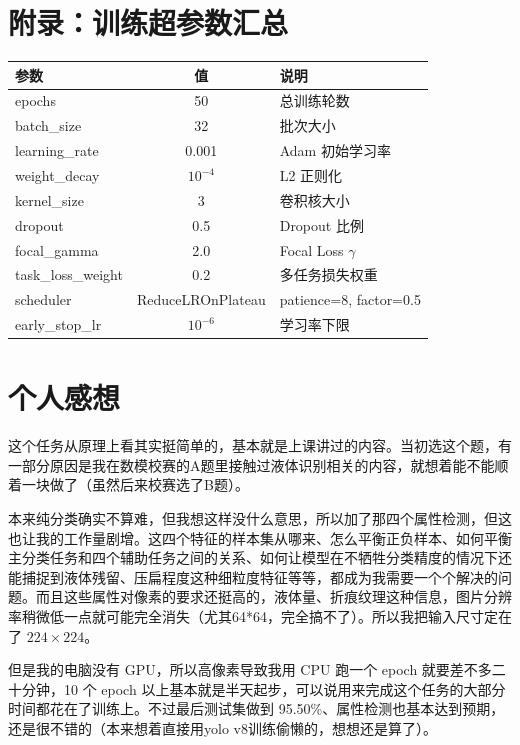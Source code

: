 \documentclass[11pt,a4paper]{ctexart}
\begin{document}
\section*{附录：训练超参数汇总}

\begin{table}[H]
\centering\small
\begin{tabular}{lcl}
\toprule
\textbf{参数} & \textbf{值} & \textbf{说明} \\
\midrule
epochs & 50 & 总训练轮数 \\
batch\_size & 32 & 批次大小 \\
learning\_rate & 0.001 & Adam 初始学习率 \\
weight\_decay & $10^{-4}$ & L2 正则化 \\
kernel\_size & 3 & 卷积核大小 \\
dropout & 0.5 & Dropout 比例 \\
focal\_gamma & 2.0 & Focal Loss $\gamma$ \\
task\_loss\_weight & 0.2 & 多任务损失权重 \\
scheduler & ReduceLROnPlateau & patience=8, factor=0.5 \\
early\_stop\_lr & $10^{-6}$ & 学习率下限 \\
\bottomrule
\end{tabular}
\end{table}

\section*{个人感想}

这个任务从原理上看其实挺简单的，基本就是上课讲过的内容。当初选这个题，有一部分原因是我在数模校赛的A题里接触过液体识别相关的内容，就想着能不能顺着一块做了（虽然后来校赛选了B题）。

本来纯分类确实不算难，但我想这样没什么意思，所以加了那四个属性检测，但这也让我的工作量剧增。这四个特征的样本集从哪来、怎么平衡正负样本、如何平衡主分类任务和四个辅助任务之间的关系、如何让模型在不牺牲分类精度的情况下还能捕捉到液体残留、压扁程度这种细粒度特征等等，都成为我需要一个个解决的问题。而且这些属性对像素的要求还挺高的，液体量、折痕纹理这种信息，图片分辨率稍微低一点就可能完全消失（尤其64*64，完全搞不了）。所以我把输入尺寸定在了 $224\times224$。

但是我的电脑没有 GPU，所以高像素导致我用 CPU 跑一个 epoch 就要差不多二十分钟，10 个 epoch 以上基本就是半天起步，可以说用来完成这个任务的大部分时间都花在了训练上。不过最后测试集做到 95.50\%、属性检测也基本达到预期，还是很不错的（本来想着直接用yolo v8训练偷懒的，想想还是算了）。
\end{document}
